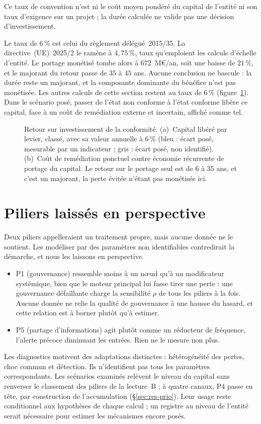 Ce taux de convention n'est ni le coût moyen pondéré du capital de l'entité ni son taux
d'exigence sur un projet ; la durée calculée ne valide pas une décision d'investissement.

Le taux de $6\,\%$ est celui du règlement délégué~2015/35. La directive~(UE)~2025/2 le ramène à
$4{,}75\,\%$, taux qu'emploient les calculs d'échelle d'entité. Le portage monétisé tombe alors à
$672$~M\euro/an, soit une baisse de $21\,\%$, et le majorant du retour passe de $35$ à $45$ ans. Aucune
conclusion ne bascule : la durée reste un majorant, et la composante dominante du bénéfice n'est pas
monétisée. Les autres calculs de cette section restent au taux de $6\,\%$
(figure~\ref{fig:roi}). Dans le scénario posé, passer de l'état non conforme à l'état conforme libère ce capital, face à un
coût de remédiation externe et incertain, affiché comme tel.

\begin{figure}[H]\centering
{}
\caption{Retour sur investissement de la conformité. (a)~Capital libéré par levier, classé, avec sa
valeur annuelle à $6\,\%$ (bleu : écart posé, mesurable par un indicateur ; gris : écart posé, non identifié). (b)~Coût de remédiation ponctuel contre
économie récurrente de portage du capital. Le retour sur le portage seul est de $6$ à $35$ ans, et
c'est un majorant, la perte évitée n'étant pas monétisée ici.}
\label{fig:roi}
\end{figure}

\section{Piliers laissés en perspective}
\label{sec:perspectives-pilier}

Deux piliers appelleraient un traitement propre, mais aucune donnée ne le soutient. Les modéliser par
des paramètres non identifiables contredirait la démarche, et nous les laissons en perspective.
\begin{itemize}\itemsep2pt
\item P1 (gouvernance) ressemble moins à un n\oe{}ud qu'à un modificateur systémique, bien que le moteur principal lui fasse tirer une perte : une gouvernance
      défaillante charge la sensibilité $\rho$ de tous les piliers à la fois. Aucune donnée ne relie la
      qualité de gouvernance à une hausse du hasard, et cette relation est à borner plutôt qu'à
      estimer.
\item P5 (partage d'informations) agit plutôt comme un réducteur de fréquence, l'alerte précoce
      diminuant les entrées. Rien ne le mesure non plus.
\end{itemize}
Les diagnostics motivent des adaptations distinctes : hétérogénéité des pertes, choc commun et
détection. Ils n'identifient pas tous les paramètres correspondants. Les scénarios examinés
relèvent le niveau du capital sans renverser le classement des piliers de la lecture~B ; à quatre canaux, P4 passe en tête, par construction de l'accumulation (\S\ref{sec:res-prio}). Leur usage reste
conditionnel aux hypothèses de chaque calcul ; un registre au niveau de l'entité serait nécessaire
pour estimer les mécanismes encore posés.
